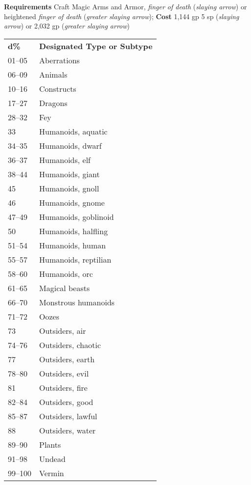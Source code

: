 \textbf{Requirements} Craft Magic Arms and Armor, \textit{finger of death} (\textit{slaying arrow}) or heightened\textit{ finger of death} (\textit{greater slaying arrow}); \textbf{Cost }1,144 gp 5 sp (\textit{slaying arrow}) or 2,032 gp (\textit{greater slaying arrow})
\begin{tabular}{ll}
\textbf{d\%} & \textbf{Designated Type or Subtype} \\
01–05        & Aberrations                         \\
06–09        & Animals                             \\
10–16        & Constructs                          \\
17–27        & Dragons                             \\
28–32        & Fey                                 \\
33           & Humanoids, aquatic                  \\
34–35        & Humanoids, dwarf                    \\
36–37        & Humanoids, elf                      \\
38–44        & Humanoids, giant                    \\
45           & Humanoids, gnoll                    \\
46           & Humanoids, gnome                    \\
47–49        & Humanoids, goblinoid                \\
50           & Humanoids, halfling                 \\
51–54        & Humanoids, human                    \\
55–57        & Humanoids, reptilian                \\
58–60        & Humanoids, orc                      \\
61–65        & Magical beasts                      \\
66–70        & Monstrous humanoids                 \\
71–72        & Oozes                               \\
73           & Outsiders, air                      \\
74–76        & Outsiders, chaotic                  \\
77           & Outsiders, earth                    \\
78–80        & Outsiders, evil                     \\
81           & Outsiders, fire                     \\
82–84        & Outsiders, good                     \\
85–87        & Outsiders, lawful                   \\
88           & Outsiders, water                    \\
89–90        & Plants                              \\
91–98        & Undead                              \\
99–100       & Vermin                             
\end{tabular}

